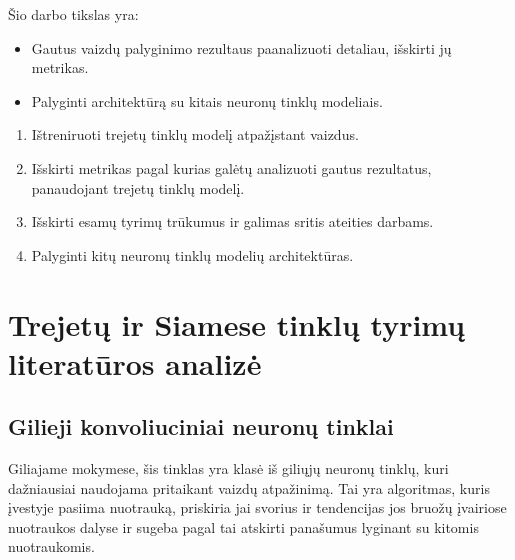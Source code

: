 \documentclass{VUMIFPSkursinis}
\begin{document}
\pagebreak
{}
Šio darbo tikslas yra:
\begin{itemize}
\item{Gautus vaizdų palyginimo rezultaus paanalizuoti detaliau, išskirti jų metrikas.}
\item{Palyginti architektūrą su kitais neuronų tinklų modeliais.}
\end{itemize}
 
\thispagestyle{empty}
\begin{enumerate}
\item{Ištreniruoti trejetų tinklų modelį atpažįstant vaizdus.}
\item{ Išskirti metrikas pagal kurias galėtų analizuoti gautus rezultatus, panaudojant trejetų tinklų modelį.}
\item{Išskirti esamų tyrimų trūkumus ir galimas sritis ateities darbams.}
\item{Palyginti kitų neuronų tinklų modelių architektūras.}
\end{enumerate}

\pagebreak
\section{Trejetų ir Siamese tinklų tyrimų literatūros analizė}

\subsection{Gilieji konvoliuciniai neuronų tinklai}
Giliajame mokymese, šis tinklas yra klasė iš giliųjų neuronų tinklų, kuri dažniausiai naudojama pritaikant vaizdų atpažinimą. Tai yra algoritmas, kuris įvestyje pasiima nuotrauką, priskiria jai svorius ir tendencijas jos bruožų įvairiose nuotraukos dalyse ir sugeba pagal tai atskirti panašumus lyginant su kitomis nuotraukomis.
\end{document}
